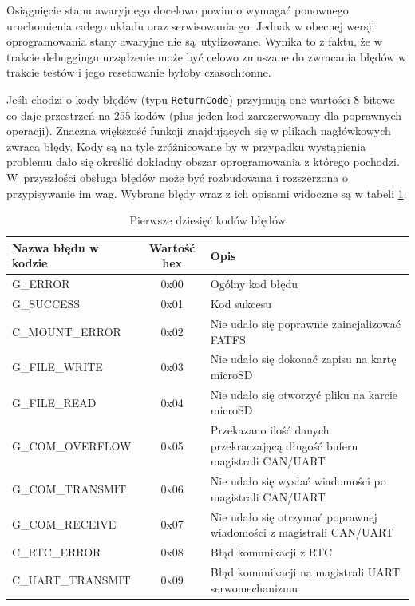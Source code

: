 Osiągnięcie stanu awaryjnego docelowo powinno wymagać ponownego uruchomienia całego układu oraz serwisowania go. Jednak w obecnej wersji oprogramowania stany awaryjne nie są~utylizowane. Wynika to z faktu, że w trakcie debuggingu urządzenie może być celowo zmuszane do zwracania błędów w trakcie testów i jego resetowanie byłoby czasochłonne.

Jeśli chodzi o kody błędów (typu \texttt{ReturnCode}) przyjmują one wartości 8-bitowe co daje przestrzeń na 255 kodów  (plus jeden kod zarezerwowany dla poprawnych operacji). Znaczna większość funkcji znajdujących się w plikach nagłówkowych zwraca błędy. Kody są na tyle zróżnicowane by w przypadku wystąpienia problemu dało się określić dokładny obszar oprogramowania z którego pochodzi. W~przyszłości obsługa błędów może być rozbudowana i rozszerzona o przypisywanie im wag. Wybrane błędy wraz z ich opisami widoczne są w tabeli \ref{tab: error_table}.
    \begin{table}[!ht]
        \centering
        \begin{tabular}{l| c | p{6cm}}
            Nazwa błędu w kodzie & Wartość hex & Opis \\ \hline \hline 
            G\_ERROR          & 0x00 & Ogólny kod błędu \\ \hline
            G\_SUCCESS        & 0x01 & Kod sukcesu \\ \hline
            C\_MOUNT\_ERROR   & 0x02 & Nie udało się poprawnie zaincjalizować FATFS \\ \hline
            G\_FILE\_WRITE    & 0x03 & Nie udało się dokonać zapisu na kartę microSD\\ \hline
            G\_FILE\_READ     & 0x04 & Nie udało się otworzyć pliku na karcie microSD\\ \hline
            G\_COM\_OVERFLOW  & 0x05 & Przekazano ilość danych przekraczającą długość buferu magistrali CAN/UART \\ \hline
            G\_COM\_TRANSMIT  & 0x06 & Nie udało się wysłać wiadomości po magistrali CAN/UART \\ \hline
            G\_COM\_RECEIVE   & 0x07  & Nie udało się otrzymać poprawnej wiadomości z magistrali CAN/UART \\ \hline
            C\_RTC\_ERROR     & 0x08 & Błąd komunikacji z RTC \\ \hline
            C\_UART\_TRANSMIT & 0x09 & Błąd komunikacji na magistrali UART serwomechanizmu \\ \hline 
        \end{tabular}
        \caption{Pierwsze dziesięć kodów błędów}
        \label{tab: error_table}
    \end{table}

